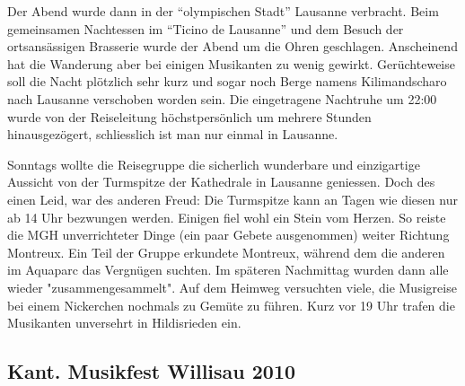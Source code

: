 \begin{history}
    Der Abend wurde dann in der \enquote{olympischen Stadt} Lausanne verbracht.
    Beim gemeinsamen Nachtessen im \enquote{Ticino de Lausanne} und dem Besuch
    der ortsansässigen Brasserie wurde der Abend um die Ohren geschlagen.
    Anscheinend hat die Wanderung aber bei einigen Musikanten zu wenig gewirkt.
    Gerüchteweise soll die Nacht plötzlich sehr kurz und sogar noch Berge namens
    Kilimandscharo nach Lausanne verschoben worden sein. Die eingetragene
    Nachtruhe um 22:00 wurde von der Reiseleitung höchstpersönlich um mehrere
    Stunden hinausgezögert, schliesslich ist man nur einmal in Lausanne.

    Sonntags wollte die Reisegruppe die sicherlich wunderbare und einzigartige
    Aussicht von der Turmspitze der Kathedrale in Lausanne geniessen. Doch des
    einen Leid, war des anderen Freud: Die Turmspitze kann an Tagen wie diesen
    nur ab 14 Uhr bezwungen werden. Einigen fiel wohl ein Stein vom Herzen. So
    reiste die MGH unverrichteter Dinge (ein paar Gebete ausgenommen) weiter
    Richtung Montreux. Ein Teil der Gruppe erkundete Montreux, während dem die
    anderen im Aquaparc das Vergnügen suchten. Im späteren Nachmittag wurden
    dann alle wieder "zusammengesammelt". Auf dem Heimweg versuchten viele, die
    Musigreise bei einem Nickerchen nochmals zu Gemüte zu führen. Kurz vor 19
    Uhr trafen die Musikanten unversehrt in Hildisrieden ein.


\end{history}
\subsection*{Kant. Musikfest Willisau 2010}

